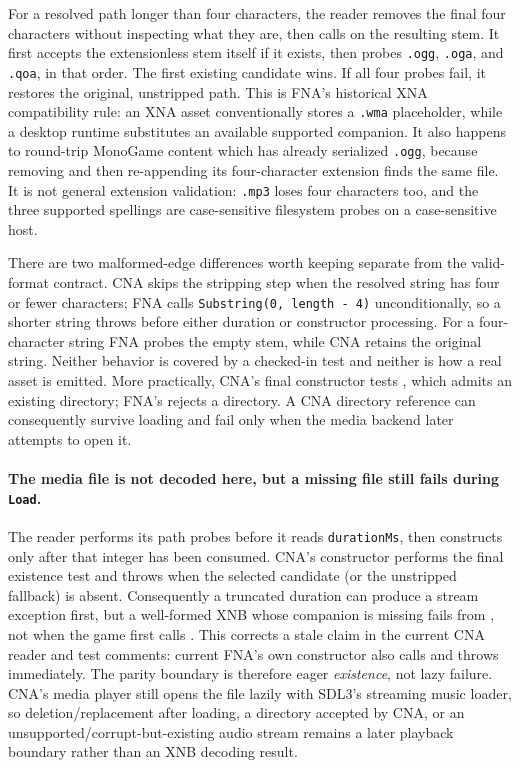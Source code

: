 For a resolved path longer than four characters, the reader removes the final four characters
without inspecting what they are, then calls  on the resulting stem.  It first
accepts the extensionless stem itself if it exists, then probes \texttt{.ogg}, \texttt{.oga}, and
\texttt{.qoa}, in that order.  The first existing candidate wins.  If all four probes fail, it
restores the original, unstripped path.  This is FNA's historical XNA compatibility rule: an XNA
asset conventionally stores a \texttt{.wma} placeholder, while a desktop runtime substitutes an
available supported companion.  It also happens to round-trip MonoGame content which has already
serialized \texttt{.ogg}, because removing and then re-appending its four-character extension
finds the same file.  It is not general extension validation: \texttt{.mp3} loses four characters
too, and the three supported spellings are case-sensitive filesystem probes on a case-sensitive
host.

There are two malformed-edge differences worth keeping separate from the valid-format contract.
CNA skips the stripping step when the resolved string has four or fewer characters; FNA calls
\texttt{Substring(0, length - 4)} unconditionally, so a shorter string throws before either
duration or constructor processing.  For a four-character string FNA probes the empty stem, while
CNA retains the original string.  Neither behavior is covered by a checked-in test and neither is
how a real  asset is emitted.  More practically, CNA's final 
constructor tests , which admits an existing directory; FNA's
 rejects a directory.  A CNA directory reference can consequently survive
loading and fail only when the media backend later attempts to open it.

\paragraph{The media file is not decoded here, but a missing file still fails during \texttt{Load}.}
The reader performs its path probes before it reads \texttt{durationMs}, then constructs
 only after that integer has been consumed.  CNA's constructor performs the final
existence test and throws  when the selected candidate (or the
unstripped fallback) is absent.  Consequently a truncated duration can produce a stream exception
first, but a well-formed XNB whose companion is missing fails from ,
not when the game first calls .  This corrects a stale claim in the
current CNA reader and test comments: current FNA's own  constructor also calls
 and throws  immediately.  The parity boundary
is therefore eager \emph{existence}, not lazy failure.  CNA's media player still opens the file
lazily with SDL3's streaming music loader, so deletion/replacement after loading, a directory
accepted by CNA, or an unsupported/corrupt-but-existing audio stream remains a later playback
boundary rather than an XNB decoding result.


